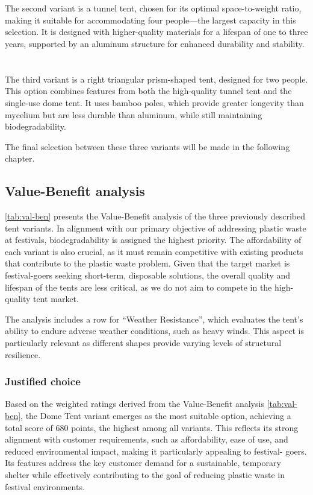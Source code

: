 \documentclass{article}
\newcommand{\pph}[1]{\paragraph{#1} \phantom{}\\}
\begin{document}
\pph{\color{neworange}{Variant 2: Tunner tent (Four-person, Long-lasting)}}
The second variant is a tunnel tent, chosen for its optimal space-to-weight ratio, making
it suitable for accommodating four people—the largest capacity in this selection. It is
designed with higher-quality materials for a lifespan of one to three years, supported by
an aluminum structure for enhanced durability and stability.

\pph{\color{newblue}{Variant 3: Triangular prism tent (Two-person, Medium-lasting)}}
The third variant is a right triangular prism-shaped tent, designed for two people.
This option combines features from both the high-quality tunnel tent and the single-use
dome tent. It uses bamboo poles, which provide greater longevity than mycelium but are
less durable than aluminum, while still maintaining biodegradability.

The final selection between these three variants will be made in the following chapter.

\subsection{Value-Benefit analysis}
\autoref{tab:val-ben} presents the Value-Benefit analysis of the three previously described tent
variants. In alignment with our primary objective of addressing plastic waste at festivals,
biodegradability is assigned the highest priority. The affordability of each variant is
also crucial, as it must remain competitive with existing products that contribute to the
plastic waste problem. Given that the target market is festival-goers seeking short-term,
disposable solutions, the overall quality and lifespan of the tents are less critical, as
we do not aim to compete in the high-quality tent market.

The analysis includes a row for ``Weather Resistance'', which evaluates the tent's ability
to endure adverse weather conditions, such as heavy winds. This aspect is particularly
relevant as different shapes provide varying levels of structural resilience.

\subsubsection{Justified choice}
Based on the weighted ratings derived from the Value-Benefit analysis \autoref{tab:val-ben},
the Dome Tent variant emerges as the most suitable option, achieving a
total score of 680 points, the highest among all variants. This reflects its strong
alignment with customer requirements, such as affordability, ease of use, and
reduced environmental impact, making it particularly appealing to festival-
goers. Its features address the key customer demand for a sustainable,
temporary shelter while effectively contributing to the goal of reducing plastic
waste in festival environments.
\end{document}
